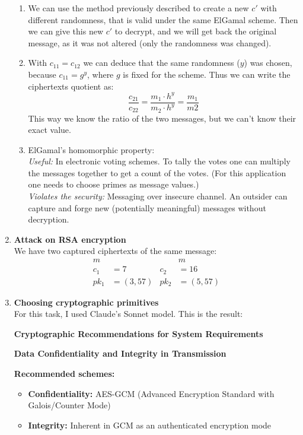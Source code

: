 \documentclass{article}
\begin{document}
\begin{enumerate}[label=\textbf{Task \arabic*:}]
\begin{enumerate}[label=\textit{Part \roman*}]
			\item We can use the method previously described to create a new $c'$ with different randomness, that is valid under the same ElGamal scheme. Then we can give this new $c'$ to decrypt, and we will get back the original message, as it was not altered (only the randomness was changed).
			\item With $c_{11} = c_{12}$ we can deduce that the same randomness ($y$) was chosen, because $c_11 = g^y$, where $g$ is fixed for the scheme. Thus we can write the ciphertexts quotient as:
			\[ \frac{c_{21}}{c_{22}} = \frac{m_1 \cdot h^y}{m_2 \cdot h^y} = \frac{m_1}{m2} \]
			This way we know the ratio of the two messages, but we can't know their exact value.
			\item ElGamal's homomorphic property:\\
			\textit{Useful:} In electronic voting schemes. To tally the votes one can multiply the messages together to get a count of the votes. (For this application one needs to choose primes as message values.) \\
			\textit{Violates the security:} Messaging over insecure channel. An outsider can capture and forge new (potentially meaningful) messages without decryption.
		\end{enumerate}
		\item \textbf{Attack on RSA encryption}\\
		We have two captured ciphertexts of the same message:
		\begin{align*}
			m & & & m\\
			c_1 &= 7 & c_2 &= 16\\
			pk_1 &= (3, 57) & pk_2 &= (5,57)
		\end{align*}
		\item \textbf{Choosing cryptographic primitives}\\
		For this task, I used Claude's Sonnet model.\cite{claude3} This is the result:\\
		\begin{tcolorbox}[ 
			breakable,
			before skip=0pt,           %
			after skip=12pt,            %
			break at=\textheight       %
			]
		\noindent\textbf{\Large Cryptographic Recommendations for System Requirements}
		
		\bigskip
		\noindent\textbf{\large Data Confidentiality and Integrity in Transmission}
		
		\noindent\textbf{Recommended schemes:}
		\begin{itemize}
			\item \textbf{Confidentiality:} AES-GCM (Advanced Encryption Standard with Galois/Counter Mode)
			\item \textbf{Integrity:} Inherent in GCM as an authenticated encryption mode
		\end{itemize}
		

\end{tcolorbox}
\end{enumerate}
\end{document}
